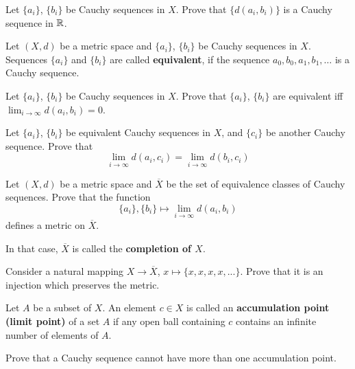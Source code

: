 \documentclass[12pt]{article}
\begin{document}
\begin{zadacha} Let $\{a_i\}$, $\{b_i\}$ be Cauchy sequences in
  $X$. Prove that $\{ d(a_i, b_i)\}$ is a Cauchy sequence in ${\mathbb R}$.
\end{zadacha}

\begin{opredelenie} Let $(X, d)$ be a metric space
and $\{a_i\}$, $\{b_i\}$ be Cauchy sequences in
$X$. Sequences $\{a_i\}$ and $\{b_i\}$ are called {\bf
equivalent}, if the sequence  $a_0, b_0, a_1, b_1,\ldots$
is a Cauchy sequence.
\end{opredelenie}

\begin{zadacha} Let $\{a_i\}$, $\{b_i\}$ be Cauchy sequences in
$X$. Prove that $\{a_i\}$, $\{b_i\}$ are equivalent iff
 $\lim_{i\to \infty} d(a_i, b_i) =0$.
\end{zadacha}

\begin{zadacha} Let $\{a_i\}$, $\{b_i\}$ be equivalent Cauchy sequences
in  $X$, and $\{c_i\}$ be another Cauchy sequence. Prove that
$$
\lim_{i\to \infty} d(a_i, c_i)=
   \lim_{i\to \infty} d(b_i, c_i)
$$
\end{zadacha}

\begin{zadacha}[!] Let $(X, d)$ be a metric space and $\overline{X}$
  be the set of equivalence classes of Cauchy sequences. Prove that
  the function
$$
\{a_i\}, \{b_i\} \mapsto \lim_{i\to \infty} d(a_i, b_i)
$$
defines a metric on $\overline X$.
\end{zadacha}

\begin{opredelenie}\label{compl.bad.defn} 
In that case, $\overline{X}$ is called the {\bf completion of $X$}.
\end{opredelenie}

\begin{zadacha} Consider a natural mapping
$X \to \overline{X}$, $x \mapsto \{ x, x, x, x, ...\}$. Prove that 
it is an injection which preserves the metric.
\end{zadacha}

\begin{opredelenie} Let $A$ be a subset of $X$.
An element $c\in X$ is called an {\bf accumulation point (limit point)} of a set 
$A$ if any open ball containing $c$ contains an infinite number of
elements of $A$.
\end{opredelenie}

\begin{zadacha} Prove that a Cauchy sequence cannot have
  more than one accumulation point.
\end{zadacha}
\end{document}

